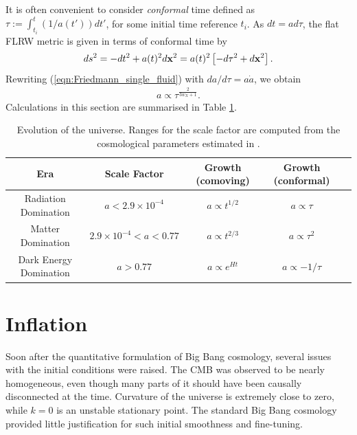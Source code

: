 It is often convenient to consider \textit{conformal} time defined as $\tau := \int_{t_i}^{t} (1/a(t')) dt'$, for some initial time reference $t_i$. As $dt = ad\tau$, the flat FLRW metric is given in terms of conformal time by
\begin{align}
	ds^2 = -dt^2 + a(t)^2 d\mathbf{x}^2 = a(t)^2 \left[ -d\tau^2 + d\mathbf{x}^2 \right]. \label{eqn:conformal_time}
\end{align}
Rewriting (\ref{eqn:Friedmann_single_fluid}) with $da/d\tau = a \dot{a}$, we obtain
\begin{align}
	a \propto \tau^\frac{2}{3w_X+1}.
\end{align}
Calculations in this section are summarised in Table \ref{table:evolution_of_the_universe}.
\begin{table}[h]
	\caption{Evolution of the universe. Ranges for the scale factor are computed from the cosmological parameters estimated in \cite{PlanckCollaboration2018Parameters}.}
	\centering
	\label{table:evolution_of_the_universe}
	\renewcommand{\arraystretch}{1.5} 
	\begin{tabular}{c  c  c  c  c} \toprule
		Era & Scale Factor & Growth (comoving) & Growth (conformal) \\ 
		
		\toprule
		Radiation Domination & $a < 2.9 \times 10^{-4}$ & $a \propto t^{1/2}$ & $a \propto \tau$ \\
		\midrule
		Matter Domination & $ 2.9 \times 10^{-4} < a < 0.77 $ & $a \propto t^{2/3}$ & $a \propto \tau^2$ \\
		\midrule
		Dark Energy Domination & $a > 0.77$ & $a \propto e^{Ht}$ & $a \propto -1/\tau$ \\
		
		\bottomrule
	\end{tabular}
\end{table}

\section{Inflation}

Soon after the quantitative formulation of Big Bang cosmology, several issues with the initial conditions were raised. The CMB was observed to be nearly homogeneous, even though many parts of it should have been causally disconnected at the time. Curvature of the universe is extremely close to zero, while $k=0$ is an unstable stationary point. The standard Big Bang cosmology provided little justification for such initial smoothness and fine-tuning.

